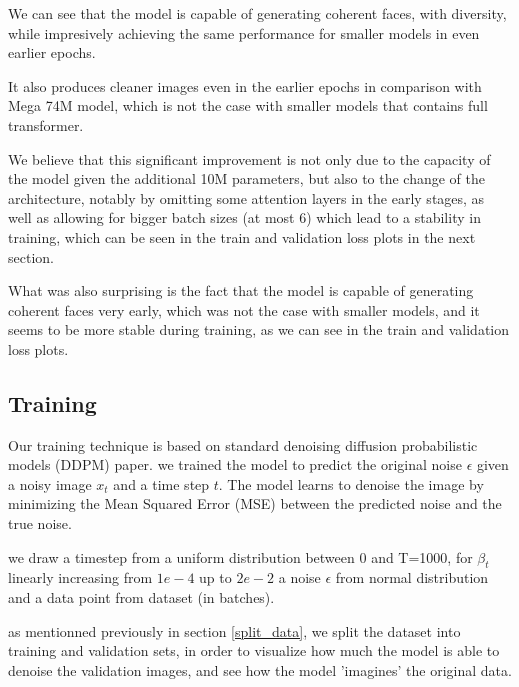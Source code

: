 \documentclass[twocolumn,superscriptaddress,aps]{revtex4-1}
\begin{document}
We can see that the model is capable of generating coherent faces, with diversity, while impresively achieving the same performance for smaller models in even earlier epochs.

It also produces cleaner images even in the earlier epochs in comparison with Mega 74M model, which is not the case with smaller models that contains full transformer.


We believe that this significant improvement is not only due to the capacity of the model given the additional 10M parameters, but also to the change of the architecture, notably by omitting some attention layers in the early stages, as well as allowing for bigger batch sizes (at most 6) which lead to a stability  in training, which can be seen in the train and validation loss plots in the next section.

What was also surprising is the fact that the model is capable of generating coherent faces very early, which was not the case with smaller models, and it seems to be more stable during training, as we can see in the train and validation loss plots.


\subsection{Training}

Our training technique is based on standard denoising diffusion probabilistic models (DDPM) paper. we trained the model to predict the original noise $\epsilon$ given a noisy image $x_t$ and a time step $t$. The model learns to denoise the image by minimizing the Mean Squared Error (MSE) between the predicted noise and the true noise.

we draw a timestep from a uniform distribution between 0 and T=1000, for $\beta_t$ linearly increasing from $1e-4$ up to $2e-2$ a noise $\epsilon$ from normal distribution and a data point from dataset (in batches).

as mentionned previously in section \ref{split_data}, we split the dataset into training and validation sets, in order to visualize how much the model is able to denoise the validation images, and see how the model 'imagines' the original data.
\end{document}
